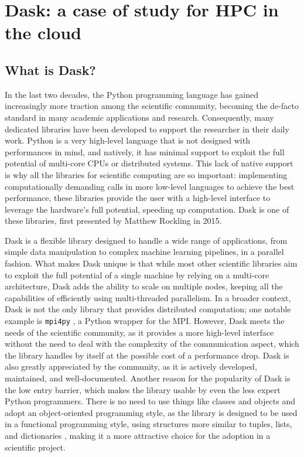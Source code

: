\chapter{Dask: a case of study for HPC in the cloud}\label{chpt:dask}

\section{What is Dask?}\label{sec:daskintro}

In the last two decades, the Python programming language has gained increasingly
more traction among the scientific community, becoming the de-facto standard in
many academic applications and research.
Consequently, many dedicated libraries have been developed to support the
researcher in their daily work.
Python is a very high-level language that is not designed with performances in
mind, and natively, it has minimal support to exploit the full potential of
multi-core CPUs or distributed systems.
This lack of native support is why all the libraries for scientific computing
are so important: implementing computationally demanding calls in more low-level
languages to achieve the best performance, these libraries provide the user with
a high-level interface to leverage the hardware's full potential, speeding up
computation.
Dask \cite{dask2015} is one of these libraries, first presented by Matthew
Rockling in 2015.

Dask is a flexible library designed to handle a wide range of applications, from
simple data manipulation to complex machine learning pipelines, in a parallel
fashion.
What makes Dask unique is that while most other scientific libraries aim to
exploit the full potential of a single machine by relying on a multi-core
architecture, Dask adds the ability to scale on multiple nodes, keeping all the
capabilities of efficiently using multi-threaded parallelism.
In a broader context, Dask is not the only library that provides distributed
computation; one notable example is \texttt{mpi4py} \cite{Dalcin2021}, a Python
wrapper for the MPI.
However, Dask meets the needs of the scientific community, as it provides a more
high-level interface without the need to deal with the complexity of the
communication aspect, which the library handles by itself at the possible cost
of a performance drop.
Dask is also greatly appreciated by the community, as it is actively developed,
maintained, and well-documented.
Another reason for the popularity of Dask is the low entry barrier, which makes
the library usable by even the less expert Python programmers.
There is no need to use things like classes and objects and adopt an
object-oriented programming style, as the library is designed to be used in a
functional programming style, using structures more similar to tuples, lists,
and dictionaries  \cite{dask2015}, making it a more attractive choice for the
adoption in a scientific project.

